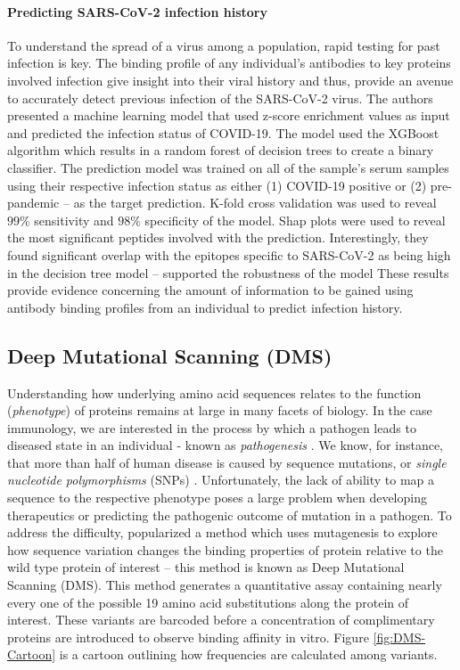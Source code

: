 \documentclass{article}
\begin{document}
\paragraph{Predicting SARS-CoV-2 infection history} 
To understand the spread of a virus among a population, rapid testing for past infection is key.
The binding profile of any individual's antibodies to key proteins involved infection give insight into their viral history and thus, provide an avenue to accurately detect previous infection of the SARS-CoV-2 virus.
The authors presented a machine learning model that used z-score enrichment values as input and predicted the infection status of COVID-19.
The model used the XGBoost algorithm which results in a random forest of decision trees to create a binary classifier.
The prediction model was trained on all of the sample's serum samples using their respective infection status as either (1) COVID-19 positive or (2) pre-pandemic -- as the target prediction.
K-fold cross validation was used to reveal $99\%$ sensitivity and $98\%$ specificity of the model.
Shap plots were used to reveal the most significant peptides involved with the prediction.
Interestingly, they found significant overlap with the epitopes specific to SARS-CoV-2 as being high in the decision tree model -- supported the robustness of the model
These results provide evidence concerning the amount of information to be gained using antibody binding profiles from an individual to predict infection history.

\subsection*{Deep Mutational Scanning (DMS)}

Understanding how underlying amino acid sequences relates to the function (\textit{phenotype}) of proteins remains at large in many facets of biology.
In the case immunology, we are interested in the process by which a pathogen leads to diseased state in an individual - known as \textit{pathogenesis} \citep{Araya2011, Fowler2014, Weile2018}.
We know, for instance, that more than half of human disease is caused by sequence mutations, or \textit{single nucleotide polymorphisms} (SNPs) \citep{Stenson2009}.
Unfortunately, the lack of ability to map a sequence to the respective phenotype poses a large problem when developing therapeutics or predicting the pathogenic outcome of mutation in a pathogen.
To address the difficulty, \citep{Araya2011} popularized a method which uses mutagenesis to explore how sequence variation changes the binding properties of protein relative to the wild type protein of interest -- this method is known as Deep Mutational Scanning (DMS).
This method generates a quantitative assay containing nearly every one of the possible 19 amino acid substitutions along the protein of interest.
These variants are barcoded before a concentration of complimentary proteins are introduced to observe binding affinity in vitro.
Figure \ref{fig:DMS-Cartoon} is a cartoon outlining how frequencies are calculated among variants.
\end{document}
